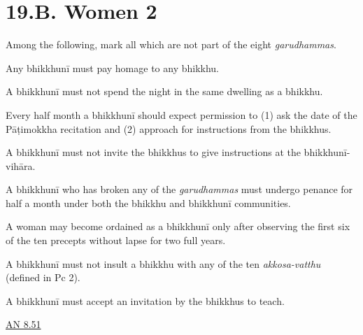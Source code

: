 \chapter{19.B. Women 2}
\renewcommand*{\theChapterTitle}{19.B. Women 2}


\begin{problem}
  Among the following, mark all which are not part of the eight \emph{garudhammas}.

  \begin{manswers}{1}
    \bChoices

     Any bhikkhunī must pay homage to any bhikkhu. \eAns

     A bhikkhunī must not spend the night in the same dwelling as a bhikkhu. \eAns

     Every half month a bhikkhunī should expect permission to (1) ask the date of the Pāṭimokkha recitation and (2) approach for instructions from the bhikkhus. \eAns

     A bhikkhunī must not invite the bhikkhus to give instructions at the bhikkhunī-vihāra. \eAns

     A bhikkhunī who has broken any of the \emph{garudhammas} must undergo penance for half a month under both the bhikkhu and bhikkhunī communities. \eAns

     A woman may become ordained as a bhikkhunī only after observing the first six of the ten precepts without lapse for two full years. \eAns

     A bhikkhunī must not insult a bhikkhu with any of the ten \emph{akkosa-vatthu} (defined in Pc 2). \eAns

     A bhikkhunī must accept an invitation by the bhikkhus to teach. \eAns

    \eChoices
  \end{manswers}

  \begin{solution}
    \href{https://suttacentral.net/an8.51/en/sujato}{AN 8.51}
  \end{solution}


\end{problem}
